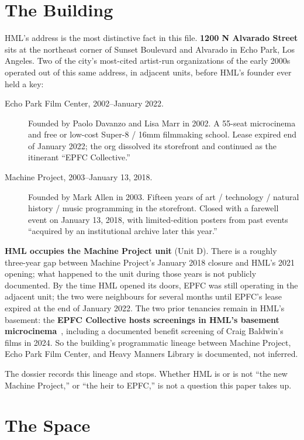 \documentclass[10pt,letterpaper,twocolumn]{article}
\begin{document}
\section{The Building}

HML's address is the most distinctive fact in this file. \textbf{1200 N Alvarado Street} sits at the northeast corner of Sunset Boulevard and Alvarado in Echo Park, Los Angeles. Two of the city's most-cited artist-run organizations of the early 2000s operated out of this same address, in adjacent units, before HML's founder ever held a key:

\begin{description}
\item[Echo Park Film Center, 2002--January 2022.] Founded by Paolo Davanzo and Lisa Marr in 2002. A 55-seat microcinema and free or low-cost Super-8 / 16mm filmmaking school. Lease expired end of January 2022; the org dissolved its storefront and continued as the itinerant ``EPFC Collective.''~\citep{eastsiderepfc2022}
\item[Machine Project, 2003--January 13, 2018.] Founded by Mark Allen in 2003. Fifteen years of art / technology / natural history / music programming in the storefront. Closed with a farewell event on January 13, 2018, with limited-edition posters from past events ``acquired by an institutional archive later this year.''~\citep{hyperallergicmachine2018, wikipediamachine}
\end{description}

\textbf{HML occupies the Machine Project unit} (Unit D). There is a roughly three-year gap between Machine Project's January 2018 closure and HML's 2021 opening; what happened to the unit during those years is not publicly documented. By the time HML opened its doors, EPFC was still operating in the adjacent unit; the two were neighbours for several months until EPFC's lease expired at the end of January 2022. The two prior tenancies remain in HML's basement: the \textbf{EPFC Collective hosts screenings in HML's basement microcinema}~\citep{hyperallergic2024indie}, including a documented benefit screening of Craig Baldwin's films in 2024. So the building's programmatic lineage between Machine Project, Echo Park Film Center, and Heavy Manners Library is documented, not inferred.

The dossier records this lineage and stops. Whether HML is or is not ``the new Machine Project,'' or ``the heir to EPFC,'' is not a question this paper takes up.

\section{The Space}
\end{document}
